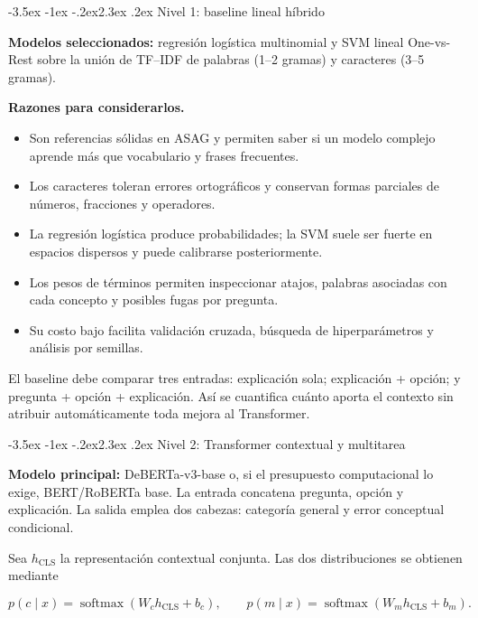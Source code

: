 \documentclass[11pt,oneside,openany]{book}
\makeatletter
\renewcommand\section{\@startsection{section}{1}{\z@}%
  {-3.5ex \@plus -1ex \@minus -.2ex}{2.3ex \@plus .2ex}%
  {\normalfont\Large\sffamily\bfseries\color{AzulMedio}}}
\newcommand{\nivel}[1]{\textcolor{TurquesaOscuro}{\sffamily\bfseries #1}}
\makeatother
\begin{document}
\section{Nivel 1: baseline lineal híbrido}

\nivel{Modelos seleccionados:} regresión logística multinomial y SVM lineal
One-vs-Rest sobre la unión de TF--IDF de palabras (1--2 gramas) y caracteres
(3--5 gramas).

\textbf{Razones para considerarlos.}

\begin{itemize}
  \item Son referencias sólidas en ASAG y permiten saber si un modelo complejo
  aprende más que vocabulario y frases frecuentes.
  \item Los caracteres toleran errores ortográficos y conservan formas parciales de
  números, fracciones y operadores.
  \item La regresión logística produce probabilidades; la SVM suele ser fuerte en
  espacios dispersos y puede calibrarse posteriormente.
  \item Los pesos de términos permiten inspeccionar atajos, palabras asociadas con
  cada concepto y posibles fugas por pregunta.
  \item Su costo bajo facilita validación cruzada, búsqueda de hiperparámetros y
  análisis por semillas.
\end{itemize}

El baseline debe comparar tres entradas: explicación sola; explicación + opción;
y pregunta + opción + explicación. Así se cuantifica cuánto aporta el contexto sin
atribuir automáticamente toda mejora al Transformer.

\section{Nivel 2: Transformer contextual y multitarea}

\nivel{Modelo principal:} DeBERTa-v3-base o, si el presupuesto computacional lo
exige, BERT/RoBERTa base. La entrada concatena pregunta, opción y explicación. La
salida emplea dos cabezas: categoría general y error conceptual condicional.

Sea $h_{\mathrm{CLS}}$ la representación contextual conjunta. Las dos
distribuciones se obtienen mediante

\[
p(c\mid x)=\operatorname{softmax}(W_c h_{\mathrm{CLS}}+b_c),\qquad
p(m\mid x)=\operatorname{softmax}(W_m h_{\mathrm{CLS}}+b_m).
\]
\end{document}
